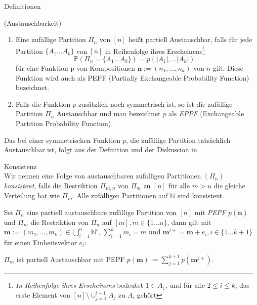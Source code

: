 \begin{section}{Definitionen}
\begin{Definition}
\end{Definition}
\begin{Definition}
    \textnormal{(Austauschbarkeit)}
    \label{Austauschbarkeit}
    \begin{enumerate}
        \item Eine zufällige Partition $\Pi_n$ von $[n]$ heißt partiell Austauschbar, falls für jede Partition $\{ A_1 ... A_k\}$ von $[n]$ in Reihenfolge ihres Erscheinens\footnote{\textit{In Reihenfolge ihres Erscheinens} bedeutet $1 \in A_1$, und für alle $2 \leq i \leq k$, das erste Element von $[n]\setminus \cup_{j=1}^{i-1}A_j$ zu $A_i$ gehört}
        \[ 
            \mathbb{P}(\Pi_n = \{ A_1 ... A_k\}) = p(|A_1|, ... |A_k|)
        \]  
        für eine Funktion p von Kompositionen $\textbf{n}:= (n_1, ..., n_k)$ von $n$ gilt. Diese Funktion wird auch als PEPF (Partially Exchangeable Probability Function) bezeichnet.
        \item Falls die Funktion $p$ zusätzlich noch symmetrisch ist, so ist die zufällige Partition $\Pi_n$ Austauschbar und man bezeichnet $p$ als \textit{EPPF} (Exchangeable Partition Probability Function).
    \end{enumerate}
\end{Definition}
\begin{Bemerkung}
    Das bei einer symmetrischen Funktion $p$, die zufällige Partition tatsächlich Austauschbar ist, folgt aus der Definition und der Diskussion in \cite[Seite 85]{aldous2006ecole}
\end{Bemerkung}
\begin{Definition}{Konsistenz}\\
    Wir nennen eine Folge von austauschbaren zufälligen Partitionen $(\Pi_n)$ \textit{konsistent}, falls die Restriktion $\Pi_{m,n}$ von $\Pi_m$ zu $[n]$ für alle $m > n$ die gleiche Verteilung hat wie $\Pi_m$. Alle zufälligen Partitionen auf $\mathbb{N}$ sind konsistent.
\end{Definition}
\begin{lemma}
    \label{lemma partielle austauschbarkeit}
    Sei $\Pi_n$ eine partiell austauschbare zufällige Partition von $[n]$ mit \textit{PEPF} $p(\textbf{n})$ und $\Pi_m$ die Restriktion von $\Pi_n$ auf $[m], m \in \{1...n\}$, dann gilt mit $\textbf{m} := (m_1,...,m_k)\in \bigcup_{i = 1 }^{n} \mathbb{N}^i$, $\sum_{i=1}^{k}m_i = m$ und $\textbf{m}^{i+} = \textbf{m} + e_i, i \in \{1...k+1\}$ für einen Einheitsvektor $e_i$:
\begin{center} 
    $\Pi_m$ ist partiell Austauschbar mit PEPF $p(\textbf{m}):=  \sum_{j=1}^{k+1} p(\textbf{m}^{j+})$.

\end{center}
\end{lemma}
\end{section}
